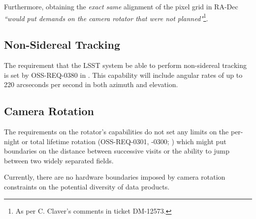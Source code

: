 Furthermore, obtaining the \emph{exact same} alignment of the pixel grid in RA-Dec 
{\it ``would put demands on the camera rotator that were not planned"}\footnote{As per 
C. Claver's comments in ticket DM-12573.}.

\subsection{Non-Sidereal Tracking}

The requirement that the LSST system be able to perform non-sidereal tracking is set by 
OSS-REQ-0380 in . 
This capability will include angular rates of up to 220 arcseconds per second in both 
azimuth and elevation. 

\subsection{Camera Rotation}

The requirements on the rotator's capabilities do not set any limits on the per-night or 
total lifetime rotation (OSS-REQ-0301, -0300; ) which might put boundaries 
on the distance between successive visits or the ability to jump between two widely 
separated fields.

Currently, there are no hardware boundaries imposed by camera rotation constraints on the potential diversity of data products.
